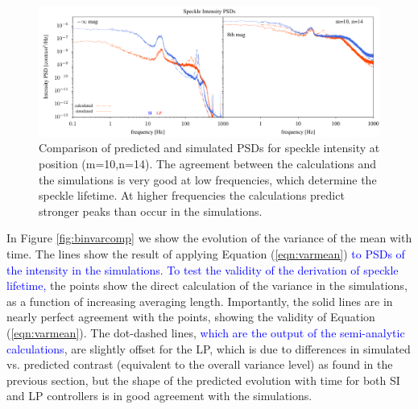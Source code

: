 \documentclass[10pt,preprint]{aastex631}
\newcommand{\jrmadd}[1]{\textcolor{blue}{#1}}
\begin{document}
\begin{figure}
\hspace{-0.3in}
\includegraphics[width=6.5in]{spPsdComp_lp_10_14.pdf}
\caption{Comparison of predicted and simulated PSDs for speckle intensity at position (m=10,n=14).  The agreement between the calculations and the simulations is very good at low frequencies, which determine the speckle lifetime.  At higher frequencies the calculations predict stronger peaks than occur in the simulations.  \label{fig:sppsdcomp}}
\end{figure}

In Figure \ref{fig:binvarcomp} we show the evolution of the variance of the mean with time.  The lines show the result of applying Equation (\ref{eqn:varmean})  \jrmadd{to PSDs of the intensity in the simulations}. \jrmadd{To test the validity of the derivation of speckle lifetime,} the points show the direct calculation of the variance in the simulations, as a function of increasing averaging length.   Importantly, the solid lines are in nearly perfect agreement with the points, showing the validity of Equation (\ref{eqn:varmean}).  The dot-dashed lines, \jrmadd{which are the output of the semi-analytic calculations}, are slightly offset for the LP, which is due to differences in simulated vs. predicted contrast (equivalent to the overall variance level) as found in the previous section, but the shape of the predicted evolution with time for both SI and LP controllers is in good agreement with the simulations.
\end{document}
